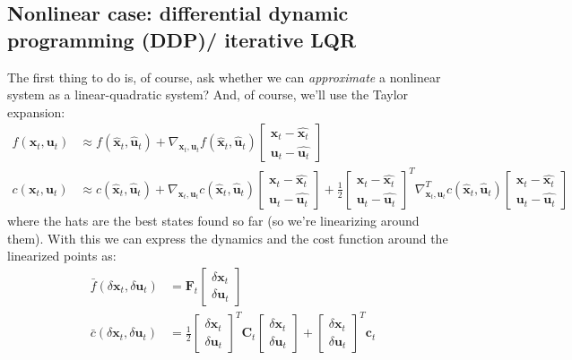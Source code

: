 \documentclass{report}
\begin{document}
\subsection{Nonlinear case: differential dynamic programming (DDP)/ iterative LQR}
The first thing to do is, of course,
ask whether we can \textit{approximate} a nonlinear system as a linear-quadratic system?
And, of course, we'll use the Taylor expansion:
\begin{align}
f (\bm{x}_{t}, \bm{u}_{t} ) &\approx f (\hat{\bm{x}}_{t}, \hat{\bm{u}}_{t} ) + 
\nabla_{ \bm{x}_{t}, \bm{u}_{t} } f (\hat{\bm{x}}_{t}, \hat{\bm{u}}_{t} ) 
\begin{bmatrix} \bm{x}_{t} - \hat{\bm{x}_{t}}\\ \bm{u}_{t} - \hat{\bm{u}_{t}} \end{bmatrix} \\
c (\bm{x}_{t}, \bm{u}_{t} ) &\approx
c (\hat{\bm{x}}_{t}, \hat{\bm{u}}_{t} ) + \nabla_{ \bm{x}_{t}, \bm{u}_{t} } c (\hat{\bm{x}}_{t}, \hat{\bm{u}}_{t} )
\begin{bmatrix} \bm{x}_{t} - \hat{\bm{x}_{t}}\\ \bm{u}_{t} - \hat{\bm{u}_{t}} \end{bmatrix}
+ \frac{1}{2} \begin{bmatrix} \bm{x}_{t} - \hat{\bm{x}_{t}}\\ \bm{u}_{t} - \hat{\bm{u}_{t}} \end{bmatrix}^{ T }
\nabla_{ \bm{x}_{t}, \bm{u}_{t} }^{ T } c (\hat{\bm{x}}_{t}, \hat{\bm{u}}_{t} ) \begin{bmatrix} \bm{x}_{t} - \hat{\bm{x}_{t}}\\ \bm{u}_{t} - \hat{\bm{u}_{t}} \end{bmatrix}
\end{align}
where the hats are the best states found so far (so we're linearizing around them).
With this we can express the dynamics and the cost function around
the linearized points as:
\begin{align}
\bar{f} (\delta\bm{x}_{t}, \delta\bm{u}_{t} ) &= \bm{F}_{t} \begin{bmatrix} \delta\bm{x}_{t} \\ \delta\bm{u}_{t} \end{bmatrix} \\
\bar{c} (\delta\bm{x}_{t}, \delta\bm{u}_{t} ) &=
\frac{1}{2} \begin{bmatrix} \delta\bm{x}_{t} \\ \delta\bm{u}_{t} \end{bmatrix}^{ T }
\bm{C}_{t} \begin{bmatrix} \delta\bm{x}_{t} \\ \delta\bm{u}_{t} \end{bmatrix} +
\begin{bmatrix} \delta\bm{x}_{t} \\ \delta\bm{u}_{t} \end{bmatrix}^{ T } \bm{c}_{t}
\end{align}
\end{document}
